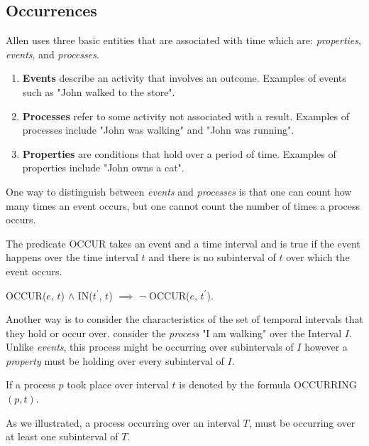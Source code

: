 \subsection{Occurrences}
Allen uses three basic entities that are associated with time which are: \textit{properties}, \textit{events}, and \textit{processes}.
\begin{enumerate}
  \item \textbf{Events} describe an activity that involves an outcome. Examples of events such as "John walked to the store".

  \item \textbf{Processes} refer to some activity not associated with a result. Examples of processes include "John was walking" and "John was running".

  \item \textbf{Properties} are conditions that hold over a period of time. Examples of properties include "John owns a cat".
\end{enumerate}
One way to distinguish between \textit{events} and \textit{processes} is that one can count how many times an event occurs, but one cannot count 
the number of times a process occurs.


The predicate OCCUR takes an event and a time interval and is true if the event happens over the time interval $t$ and there is no subinterval of $t$
over which the event occurs.

\begin{center}
  OCCUR($e$, $t$) $\land$ IN($t^\prime$, $t$) $\implies$ \(\lnot\) OCCUR($e$, $t^\prime$).
\end{center}

Another way is to consider the characteristics of the set of temporal intervals that they hold or occur over. 
consider the \textit{process} "I am walking" over the Interval $I$. Unlike \textit{events}, this process might be occurring over subintervals of $I$ however a \textit{property} must be holding over every subinterval of $I$.


If a process $p$ took place over interval $t$ is denoted by the formula OCCURRING$(p,t)$.


As we illustrated, a process occurring over an interval $T$, must be occurring over at least one subinterval of $T$.
